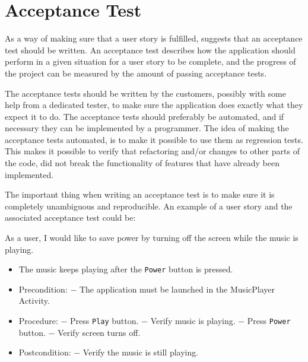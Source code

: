 \section{Acceptance Test}
As a way of making sure that a user story is fulfilled, \citet[p. 126]{xp:explored} suggests that an acceptance test should be written. An acceptance test describes how the application should perform in a given situation for a user story to be complete, and the progress of the project can be measured by the amount of passing acceptance tests.

The acceptance tests should be written by the customers, possibly with some help from a dedicated tester, to make sure the application does exactly what they expect it to do. The acceptance tests should preferably be automated, and if necessary they can be implemented by a programmer. The idea of making the acceptance tests automated, is to make it possible to use them as regression tests. This makes it possible to verify that refactoring and/or changes to other parts of the code, did not break the functionality of features that have already been implemented.

The important thing when writing an acceptance test is to make sure it is completely unambiguous and reproducible. An example of a user story and the associated acceptance test could be:

{As a user, I would like to save power by turning off the screen while the music is playing.}
{\begin{itemize}
\item The music keeps playing after the \texttt{Power} button is pressed.
\end{itemize}}
{\begin{itemize}
\item Precondition: 
\subitem $-$ The application must be launched in the MusicPlayer Activity.

\item Procedure:
\subitem $-$ Press \texttt{Play} button.
\subitem $-$ Verify music is playing.
\subitem $-$ Press \texttt{Power} button.
\subitem $-$ Verify screen turns off.

\item Postcondition:
\subitem $-$ Verify the music is still playing.
\end{itemize}}


